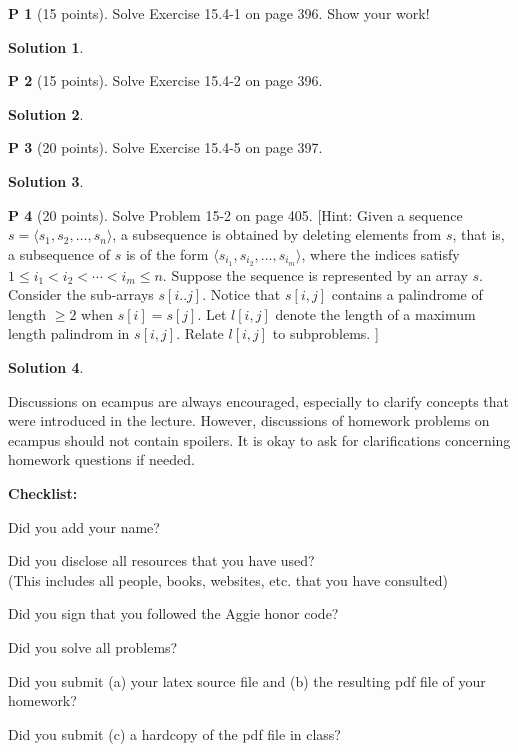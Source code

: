 \documentclass{article}
\theoremstyle{definition}
\newtheorem{problem}{P}
\newtheorem*{solution}{Solution}
\newcommand{\checklist}{\noindent\textbf{Checklist:}
\begin{compactitem}[$\Box$] 
\item Did you add your name? 
\item Did you disclose all resources that you have used? \\
(This includes all people, books, websites, etc. that you have consulted)
\item Did you sign that you followed the Aggie honor code? 
\item Did you solve all problems? 
\item Did you submit (a) your latex source file and (b) the resulting pdf file
  of your homework?
\item Did you submit (c) a hardcopy of the pdf file in class? 
\end{compactitem}
}
\begin{document}
\begin{problem}[15 points]
Solve Exercise 15.4-1 on page 396. Show your work!
\end{problem}
\begin{solution}
\end{solution}

\begin{problem}[15 points]
Solve Exercise 15.4-2 on page 396. 
\end{problem}
\begin{solution}
\end{solution}


\begin{problem}[20 points]
Solve Exercise 15.4-5 on page 397. 
\end{problem}
\begin{solution}
\end{solution}

\begin{problem}[20 points]
Solve Problem 15-2 on page 405. [Hint: Given a sequence $s= \langle s_1,
s_2, \ldots, s_n\rangle$, a subsequence is obtained by deleting
elements from $s$, that is, a subsequence of $s$ is of the form 
$ \langle s_{i_{1}}, s_{i_2}, \ldots, s_{i_m}\rangle$,
where the indices satisfy $1\le i_{1} < i_{2} < \cdots < i_{m} \le n$.  
Suppose the sequence is represented by an array $s$. 
Consider the
sub-arrays $s[i..j]$. Notice that $s[i,j]$ contains a palindrome of
length $\ge 2$ when $s[i]=s[j]$. Let $l[i,j]$ denote the length of a
maximum length palindrom in $s[i,j]$. Relate $l[i,j]$ to subproblems. ] 
\end{problem}
\begin{solution}
\end{solution}




Discussions on ecampus are always encouraged, especially to clarify
concepts that were introduced in the lecture. However, discussions of
homework problems on ecampus should not contain spoilers. It is okay to
ask for clarifications concerning homework questions if needed. 
\medskip

\goodbreak
\checklist
\end{document}
